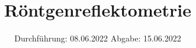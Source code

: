 

\subject{V44}
\title{Röntgenreflektometrie}
\date{%
  Durchführung: 08.06.2022
  \hspace{3em}
  Abgabe: 15.06.2022
}



\maketitle
\thispagestyle{empty}
\tableofcontents
\newpage

%




\printbibliography{}


